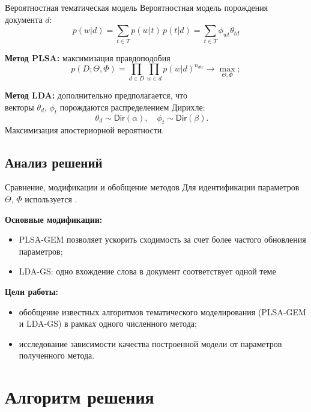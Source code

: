\documentclass[unicode,lefteqn,c,hyperref={pdfpagelabels=false}]{beamer}
\begin{document}
\begin{frame}{Вероятностная тематическая модель}
    Вероятностная модель порождения документа $d$:
    $$
        p(w|d)
        = \sum_{t\in T} p(w|t)\, p(t|d)
        = \sum_{t\in T} \phi_{wt} \theta_{td}
    $$

    \textbf{Метод PLSA:} максимизация правдоподобия
    $$
        p(D;\Theta,\Phi) = \prod_{d\in D} \prod_{w\in d} p(w|d)^{n_{dw}} \to \max\limits_{\Theta,\Phi};
    $$

    \textbf{Метод LDA:} дополнительно предполагается, что \\
    векторы $\theta_d$, $\phi_t$ порождаются распределением Дирихле:
    $$
        \theta_d \sim \textsf{Dir} (\alpha), \quad
        \phi_t \sim \textsf{Dir} (\beta). \quad
    $$ 
	Максимизация апостериорной вероятности.
\end{frame}

\subsection{Анализ решений}
\begin{frame}{Сравнение, модификации и обобщение методов}
    Для идентификации параметров $\Theta$, $\Phi$ используется .

	\textbf{Основные модификации:}
	\begin{itemize}
		\item PLSA-GEM позволяет ускорить сходимость за счет более частого обновления параметров;
		\item LDA-GS: одно вхождение слова в документ соответствует одной теме
	\end{itemize}
	
	\textbf{Цели работы:}
	\begin{itemize}
		\item обобщение известных алгоритмов тематического моделирования (PLSA-GEM и LDA-GS) в рамках одного численного метода;
		\item исследование зависимости качества построенной модели от параметров полученного метода.
	\end{itemize}
\end{frame}

\section{Алгоритм решения}
\end{document}
